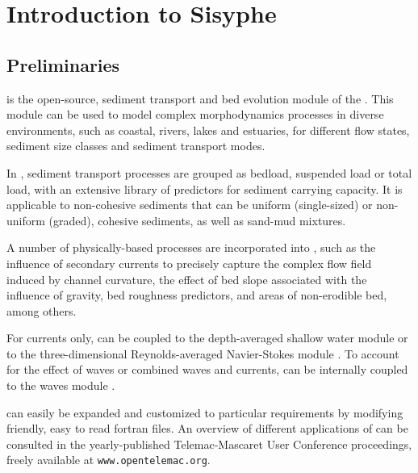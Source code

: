 \chapter[Introduction]{Introduction to Sisyphe}

\section{Preliminaries}
\sisyphe{} is the open-source, sediment transport and bed evolution module of the \telemacsystem{}. This module can be used to model complex morphodynamics processes in diverse environments, such as
coastal, rivers, lakes and estuaries, for different flow states, sediment size classes and sediment
transport modes.

In \sisyphe{}, sediment transport processes are grouped as bedload, suspended load or total load,
with an extensive library of predictors for sediment carrying capacity. It is applicable to non-cohesive sediments that can be uniform (single-sized) or non-uniform
(graded), cohesive sediments, as well as sand-mud
mixtures.

A number of physically-based processes are incorporated into \sisyphe{}, such as the influence of
secondary currents to precisely capture the complex flow field induced by channel curvature, the
effect of bed slope associated with the influence of gravity, bed roughness predictors, and areas of
non-erodible bed, among others.

For currents only, \sisyphe{} can be coupled to the depth-averaged shallow water module
 or to the three-dimensional Reynolds-averaged Navier-Stokes module .
To account for the effect of waves or combined waves and currents, \sisyphe can be internally coupled
to the waves module \tomawac{}.

\sisyphe{} can easily be expanded and customized to particular requirements by modifying friendly,
easy to read fortran files. An overview of different applications of \sisyphe{} can be consulted in the yearly-published Telemac-Mascaret User Conference proceedings, freely available at \texttt{www.opentelemac.org}.

